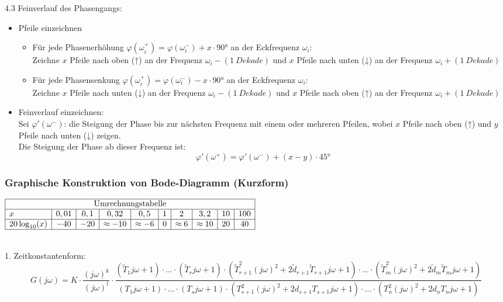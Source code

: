 \documentclass[10pt,a4paper]{article}
\begin{document}
4.3 Feinverlauf des Phasengangs:
\begin{itemize}
	\item Pfeile einzeichnen
	\begin{itemize}
		\item Für jede Phasenerhöhung $\varphi(\omega_i^+) = \varphi(\omega_i^-) + x ⋅ 90°$ an der Eckfrequenz $\omega_i$: \\
		Zeichne $x$ Pfeile nach oben (↑) an der Frequenz $\omega_i - (1 ~Dekade)$ und $x$ Pfeile nach unten (↓) an der Frequenz $\omega_i + (1 ~Dekade)$
		\item Für jede Phasensenkung $\varphi(\omega_i^+) = \varphi(\omega_i^-) - x ⋅ 90°$ an der Eckfrequenz $\omega_i$: \\
		Zeichne $x$ Pfeile nach unten (↓) an der Frequenz $\omega_i - (1 ~Dekade)$ und $x$ Pfeile nach oben (↑) an der Frequenz $\omega_i + (1 ~Dekade)$
	\end{itemize}
	\item Feinverlauf einzeichnen: \\
	Sei $\varphi'(\omega^-)$: die Steigung der Phase bis zur nächsten Frequenz mit einem oder mehreren Pfeilen, wobei $x$ Pfeile nach oben (↑) und $y$ Pfeile nach unten (↓) zeigen. \\
	Die Steigung der Phase ab dieser Frequenz ist:
	$$
		\varphi'(\omega^+) = \varphi'(\omega^-) + (x - y) ⋅ 45°
	$$
\end{itemize}

\subsubsection{Graphische Konstruktion von Bode-Diagramm (Kurzform)}
\begin{center}
	$\begin{array}{|l|c|c|c|c|c|c|c|c|c|}
	\hline
	\multicolumn{10}{|c|}{\text{Umrechnungstabelle}} \\
	\hline
	x & 0,01 & 0,1 & 0,32 & 0,5 & 1 & 2 & 3,2 & 10 & 100 \\
	\hline
	20 \log_{10}(x) & -40 & -20 & \approx -10 & \approx -6 & 0 & \approx 6 & \approx 10 & 20 & 40 \\
	\hline
	\end{array}$
\end{center} ~\\

1. Zeitkonstantenform:
$$
	G(j \omega) = K ⋅ \frac{(j \omega)^k}{(j \omega)^l} ⋅ \frac{(\tilde T_1 j \omega + 1) ⋅ \dots ⋅ (\tilde T_r j \omega + 1) ⋅ (\tilde T_{r+1}^2 (j \omega)^2 + 2\tilde d_{r+1} \tilde T_{r+1} j \omega + 1) ⋅ \dots ⋅ (\tilde T_m^2 (j \omega)^2 + 2\tilde d_m \tilde T_m j \omega + 1)}{(T_1 j \omega + 1) ⋅ \dots ⋅ (T_s j \omega + 1) ⋅ (T_{s+1}^2 (j \omega)^2 + 2 d_{s+1} T_{s+1} j \omega + 1) ⋅ \dots ⋅ (T_n^2 (j \omega)^2 + 2 d_n T_n j \omega + 1)}
$$
\end{document}
